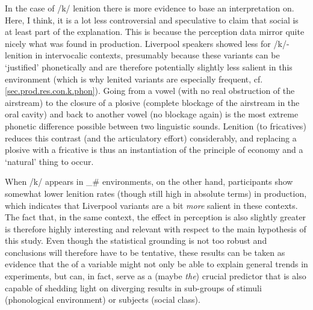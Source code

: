 In the case of /k/ lenition there is more evidence to base an interpretation on.
Here, I think, it is a lot less controversial and speculative to claim that social  is at least part of the explanation.
This is because the perception data mirror quite nicely what was found in production.
Liverpool speakers showed less  for /k/-lenition in intervocalic contexts, presumably because these variants can be `justified' phonetically and are therefore potentially slightly less salient in this environment (which is why lenited variants are especially frequent, cf. \ref{sec.prod.res.con.k.phon}).
Going from a vowel (with no real obstruction of the airstream) to the closure of a plosive (complete blockage of the airstream in the oral cavity) and back to another vowel (no blockage again) is the most extreme phonetic difference possible between two linguistic sounds.
Lenition (to fricatives) reduces this contrast (and the articulatory effort) considerably, and replacing a plosive with a fricative is thus an instantiation of the principle of economy and a `natural' thing to occur.

When /k/ appears in \_\# environments, on the other hand, participants show somewhat lower lenition rates (though still high in absolute terms) in production, which indicates that Liverpool variants are a bit \emph{more} salient in these contexts.
The fact that, in the same context, the  effect in perception is also slightly greater is therefore highly interesting and relevant with respect to the main hypothesis of this study.
Even though the statistical grounding is not too robust and conclusions will therefore have to be tentative, these results can be taken as evidence that the  of a variable might not only be able to explain general trends in   experiments, but can, in fact, serve as a (maybe \emph{the}) crucial predictor that is also capable of shedding light on diverging results in sub-groups of stimuli (phonological environment) or subjects (social class).

